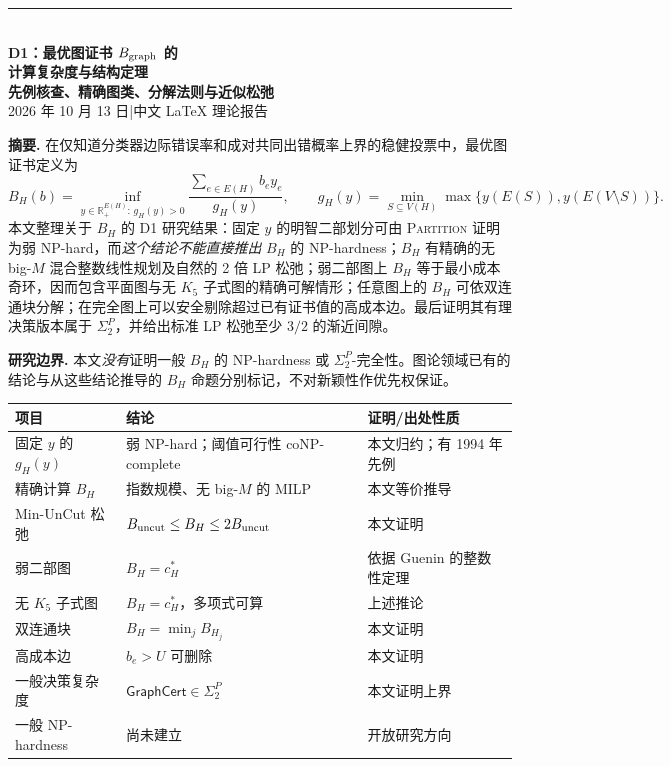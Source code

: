 \documentclass[11pt,a4paper]{ctexart}
\theoremstyle{definition}
\newcommand{\GraphCert}{\mathsf{GraphCert}}
\newcommand{\RR}{\mathbb R}
\newcommand{\1}{\boldsymbol 1}
\newcommand{\buncut}{B_{\rm uncut}}
\begin{document}
\begin{center}
{\color{accent}\rule{\linewidth}{1.4pt}}\\[10mm]
{\Huge\bfseries D1：最优图证书 $B_{\rm graph}$ 的\\[3mm]计算复杂度与结构定理}\\[6mm]
{\Large\bfseries 先例核查、精确图类、分解法则与近似松弛}\\[7mm]
{\large 2026 年 10 月 13 日\quad|\quad 中文 LaTeX 理论报告}
\end{center}
\vspace{4mm}
\begin{resultbox}
\textbf{摘要.} 在仅知道分类器边际错误率和成对共同出错概率上界的稳健投票中，最优图证书定义为
\[
 B_H(b)=\inf_{y\in\RR_+^{E(H)}:\,g_H(y)>0}
 \frac{\sum_{e\in E(H)}b_ey_e}{g_H(y)},\qquad
 g_H(y)=\min_{S\subseteq V(H)}\max\{y(E(S)),y(E(V\setminus S))\}.
\]
本文整理关于 $B_H$ 的 D1 研究结果：固定 $y$ 的明智二部划分可由 \textsc{Partition} 证明为弱 NP-hard，而\emph{这个结论不能直接推出} $B_H$ 的 NP-hardness；$B_H$ 有精确的无 big-$M$ 混合整数线性规划及自然的 2 倍 LP 松弛；弱二部图上 $B_H$ 等于最小成本奇环，因而包含平面图与无 $K_5$ 子式图的精确可解情形；任意图上的 $B_H$ 可依双连通块分解；在完全图上可以安全剔除超过已有证书值的高成本边。最后证明其有理决策版本属于 $\Sigma_2^P$，并给出标准 LP 松弛至少 $3/2$ 的渐近间隙。

\textbf{研究边界.} 本文\emph{没有}证明一般 $B_H$ 的 NP-hardness 或 $\Sigma_2^P$-完全性。图论领域已有的结论与从这些结论推导的 $B_H$ 命题分别标记，不对新颖性作优先权保证。
\end{resultbox}
\vspace{3mm}
\begin{center}
\small
\begin{tabularx}{\linewidth}{@{}p{.30\linewidth}X p{.19\linewidth}@{}}
\toprule
项目 & 结论 & 证明/出处性质 \\
\midrule
固定 $y$ 的 $g_H(y)$ & 弱 NP-hard；阈值可行性 coNP-complete & 本文归约；有 1994 年先例 \\
精确计算 $B_H$ & 指数规模、无 big-$M$ 的 MILP & 本文等价推导 \\
Min-UnCut 松弛 & $\buncut\le B_H\le 2\buncut$ & 本文证明 \\
弱二部图 & $B_H=c_H^*$ & 依据 Guenin 的整数性定理 \\
无 $K_5$ 子式图 & $B_H=c_H^*$，多项式可算 & 上述推论 \\
双连通块 & $B_H=\min_j B_{H_j}$ & 本文证明 \\
高成本边 & $b_e>U$ 可删除 & 本文证明 \\
一般决策复杂度 & $\GraphCert\in\Sigma_2^P$ & 本文证明上界 \\
一般 NP-hardness & 尚未建立 & 开放研究方向 \\
\bottomrule
\end{tabularx}
\end{center}
\newpage
\tableofcontents
\newpage
\end{document}
